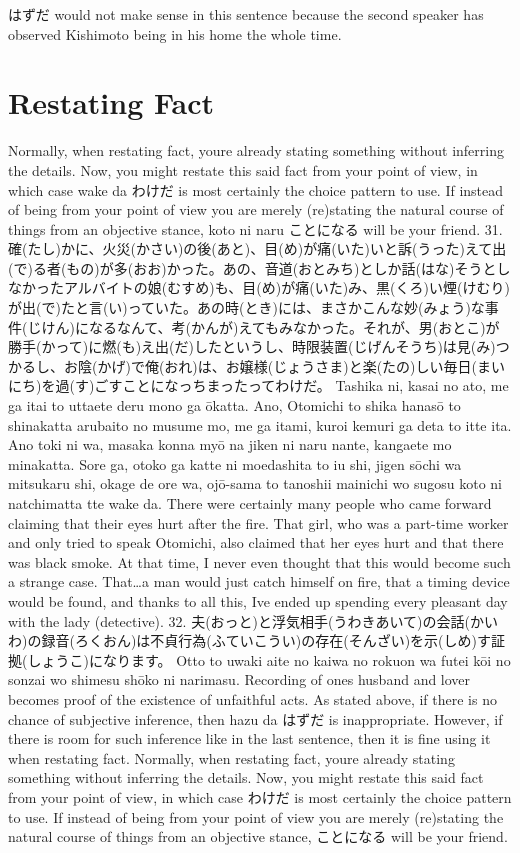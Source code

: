 \par{ \emph{ }はずだ would not make sense in this sentence because the second speaker has observed Kishimoto being in his home the whole time. }
      
\section{Restating Fact}
 Normally, when restating fact, you\textquotesingle re already stating something without inferring the details. Now, you might restate this said fact from your point of view, in which case wake da わけだ is most certainly the choice pattern to use. If instead of being from your point of view you are merely (re)stating the natural course of things from an objective stance, koto ni naru ことになる will be your friend. 31. 確(たし)かに、火災(かさい)の後(あと)、目(め)が痛(いた)いと訴(うった)えて出(で)る者(もの)が多(おお)かった。あの、音道(おとみち)としか話(はな)そうとしなかったアルバイトの娘(むすめ)も、目(め)が痛(いた)み、黒(くろ)い煙(けむり)が出(で)たと言(い)っていた。あの時(とき)には、まさかこんな妙(みょう)な事件(じけん)になるなんて、考(かんが)えてもみなかった。それが、男(おとこ)が勝手(かって)に燃(も)え出(だ)したというし、時限装置(じげんそうち)は見(み)つかるし、お陰(かげ)で俺(おれ)は、お嬢様(じょうさま)と楽(たの)しい毎日(まいにち)を過(す)ごすことになっちまったってわけだ。 Tashika ni, kasai no ato, me ga itai to uttaete deru mono ga ōkatta. Ano, Otomichi to shika hanasō to shinakatta arubaito no musume mo, me ga itami, kuroi kemuri ga deta to itte ita. Ano toki ni wa, masaka kon\textquotesingle na myō na jiken ni naru nante, kangaete mo minakatta. Sore ga, otoko ga katte ni moedashita to iu shi, jigen sōchi wa mitsukaru shi, okage de ore wa, ojō-sama to tanoshii mainichi wo sugosu koto ni natchimatta tte wake da. There were certainly many people who came forward claiming that their eyes hurt after the fire. That girl, who was a part-time worker and only tried to speak Otomichi, also claimed that her eyes hurt and that there was black smoke. At that time, I never even thought that this would become such a strange case. That…a man would just catch himself on fire, that a timing device would be found, and thanks to all this, I\textquotesingle ve ended up spending every pleasant day with the lady (detective). 32. 夫(おっと)と浮気相手(うわきあいて)の会話(かいわ)の録音(ろくおん)は不貞行為(ふていこうい)の存在(そんざい)を示(しめ)す証拠(しょうこ)になります。 Otto to uwaki aite no kaiwa no rokuon wa futei kōi no sonzai wo shimesu shōko ni narimasu. Recording of one\textquotesingle s husband and lover becomes proof of the existence of unfaithful acts. As stated above, if there is no chance of subjective inference, then hazu da はずだ is inappropriate. However, if there is room for such inference like in the last sentence, then it is fine using it when restating fact.   Normally, when restating fact, you\textquotesingle re already stating something without inferring the details. Now, you might restate this said fact from your point of view, in which case わけだ is most certainly the choice pattern to use. If instead of being from your point of view you are merely (re)stating the natural course of things from an objective stance, ことになる will be your friend.  
